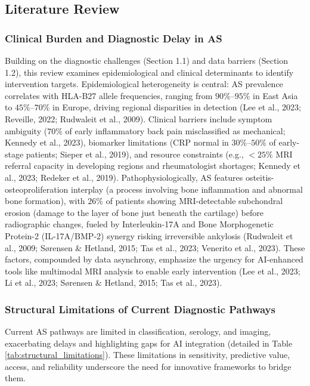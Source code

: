 \documentclass[12pt, a4paper]{article}
\begin{document}
\subsection{Literature Review}

\subsubsection{Clinical Burden and Diagnostic Delay in AS}
Building on the diagnostic challenges (Section 1.1) and data barriers (Section 1.2), this review examines epidemiological and clinical determinants to identify intervention targets. Epidemiological heterogeneity is central: AS prevalence correlates with HLA-B27 allele frequencies, ranging from $90\%$--$95\%$ in East Asia to $45\%$--$70\%$ in Europe, driving regional disparities in detection (Lee et al., 2023; Reveille, 2022; Rudwaleit et al., 2009). Clinical barriers include symptom ambiguity ($70\%$ of early inflammatory back pain misclassified as mechanical; Kennedy et al., 2023), biomarker limitations (CRP normal in $30\%$--$50\%$ of early-stage patients; Sieper et al., 2019), and resource constraints (e.g., $<25\%$ MRI referral capacity in developing regions and rheumatologist shortages; Kennedy et al., 2023; Redeker et al., 2019). Pathophysiologically, AS features osteitis-osteoproliferation interplay (a process involving bone inflammation and abnormal bone formation), with $26\%$ of patients showing MRI-detectable subchondral erosion (damage to the layer of bone just beneath the cartilage) before radiographic changes, fueled by Interleukin-17A and Bone Morphogenetic Protein-2 (IL-17A/BMP-2) synergy risking irreversible ankylosis (Rudwaleit et al., 2009; Sørensen \& Hetland, 2015; Tas et al., 2023; Venerito et al., 2023). These factors, compounded by data asynchrony, emphasize the urgency for AI-enhanced tools like multimodal MRI analysis to enable early intervention (Lee et al., 2023; Li et al., 2023; Sørensen \& Hetland, 2015; Tas et al., 2023).

\subsubsection{Structural Limitations of Current Diagnostic Pathways}
Current AS pathways are limited in classification, serology, and imaging, exacerbating delays and highlighting gaps for AI integration (detailed in Table \ref{tab:structural_limitations}). These limitations in sensitivity, predictive value, access, and reliability underscore the need for innovative frameworks to bridge them.
\end{document}
